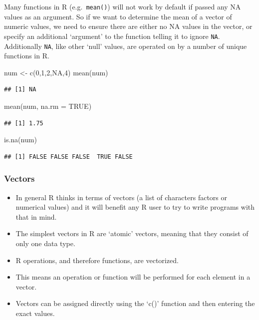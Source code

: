 \documentclass[
]{book}
\newenvironment{Shaded}{\begin{snugshade}}{\end{snugshade}}
\newcommand{\AttributeTok}[1]{\textcolor[rgb]{0.77,0.63,0.00}{#1}}
\newcommand{\ConstantTok}[1]{\textcolor[rgb]{0.00,0.00,0.00}{#1}}
\newcommand{\DecValTok}[1]{\textcolor[rgb]{0.00,0.00,0.81}{#1}}
\newcommand{\FunctionTok}[1]{\textcolor[rgb]{0.00,0.00,0.00}{#1}}
\newcommand{\NormalTok}[1]{#1}
\newcommand{\OtherTok}[1]{\textcolor[rgb]{0.56,0.35,0.01}{#1}}
\begin{document}
Many functions in R (e.g.~\texttt{mean()}) will not work by default if passed any NA values as an argument. So if we want to determine the mean of a vector of numeric values, we need to ensure there are either no NA values in the vector, or specify an additional `argument' to the function telling it to ignore \texttt{NA}. Additionally \texttt{NA}, like other `null' values, are operated on by a number of unique functions in R.

\begin{Shaded}
\begin{Highlighting}[]
\NormalTok{num }\OtherTok{\textless{}{-}} \FunctionTok{c}\NormalTok{(}\DecValTok{0}\NormalTok{,}\DecValTok{1}\NormalTok{,}\DecValTok{2}\NormalTok{,}\ConstantTok{NA}\NormalTok{,}\DecValTok{4}\NormalTok{)}
\FunctionTok{mean}\NormalTok{(num)}
\end{Highlighting}
\end{Shaded}

\begin{verbatim}
## [1] NA
\end{verbatim}

\begin{Shaded}
\begin{Highlighting}[]
\FunctionTok{mean}\NormalTok{(num, }\AttributeTok{na.rm =} \ConstantTok{TRUE}\NormalTok{)}
\end{Highlighting}
\end{Shaded}

\begin{verbatim}
## [1] 1.75
\end{verbatim}

\begin{Shaded}
\begin{Highlighting}[]
\FunctionTok{is.na}\NormalTok{(num)}
\end{Highlighting}
\end{Shaded}

\begin{verbatim}
## [1] FALSE FALSE FALSE  TRUE FALSE
\end{verbatim}

\hypertarget{vectors}{%
\subsubsection{Vectors}\label{vectors}}

\begin{itemize}
\item
  In general R thinks in terms of vectors (a list of characters factors or numerical values) and it will benefit any R user to try to write programs with that in mind.
\item
  The simplest vectors in R are `atomic' vectors, meaning that they consist of only one data type.
\item
  R operations, and therefore functions, are vectorized.
\item
  This means an operation or function will be performed for each element in a vector.
\item
  Vectors can be assigned directly using the `c()' function and then entering the exact values.
\end{itemize}
\end{document}
